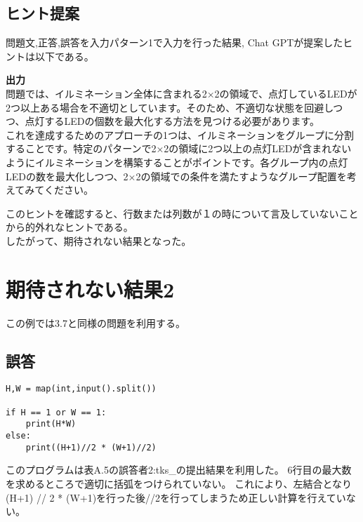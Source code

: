 \subsection{ヒント提案}
問題文,正答,誤答を入力パターン1で入力を行った結果,
Chat GPTが提案したヒントは以下である。
\begin{screen}
\textbf{出力}\\
問題では、イルミネーション全体に含まれる2×2の領域で、点灯しているLEDが2つ以上ある場合を不適切としています。そのため、不適切な状態を回避しつつ、点灯するLEDの個数を最大化する方法を見つける必要があります。\\
これを達成するためのアプローチの1つは、イルミネーションをグループに分割することです。特定のパターンで2×2の領域に2つ以上の点灯LEDが含まれないようにイルミネーションを構築することがポイントです。各グループ内の点灯LEDの数を最大化しつつ、2×2の領域での条件を満たすようなグループ配置を考えてみてください。
\end{screen}
このヒントを確認すると、行数または列数が１の時について言及していないことから的外れなヒントである。\\
したがって、期待されない結果となった。

\section{期待されない結果2}
この例では3.7と同様の問題を利用する。
\subsection{誤答}
\begin{lstlisting}
H,W = map(int,input().split())

if H == 1 or W == 1:
    print(H*W)
else:
    print((H+1)//2 * (W+1)//2)
\end{lstlisting}

このプログラムは表A.5の誤答者2:tks\_の提出結果を利用した。
6行目の最大数を求めるところで適切に括弧をつけられていない。
これにより、左結合となり(H+1) // 2 * (W+1)を行った後//2を行ってしまうため正しい計算を行えていない。

